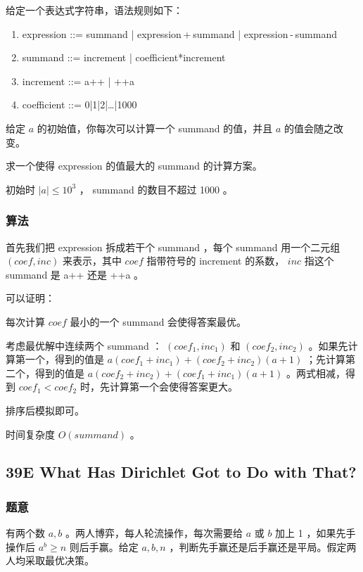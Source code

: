 \documentclass[11pt]{article}
\begin{document}
    给定一个表达式字符串，语法规则如下：
\begin{enumerate}
\item expression ::= summand | expression + summand | expression - summand
\item summand ::= increment | coefficient*increment
\item increment ::= a++ | ++a
\item coefficient ::= 0|1|2|\ldots{}|1000
\end{enumerate}

    给定 $a$ 的初始值，你每次可以计算一个 summand 的值，并且 $a$ 的值会随之改变。

    求一个使得 expression 的值最大的 summand 的计算方案。

    初始时 $|a| \leq 10^3$ ， summand 的数目不超过 1000 。
\subsubsection{算法}
\label{sec-3-2-2}

    首先我们把 expression 拆成若干个 summand ，每个 summand 用一个二元组 $(coef, inc)$ 来表示，其中 $coef$ 指带符号的 increment 的系数， $inc$ 指这个 summand 是 a++ 还是 ++a 。

    可以证明：
\begin{theorem}
   每次计算 $coef$ 最小的一个 summand 会使得答案最优。
\end{theorem}

    考虑最优解中连续两个 summand ： $(coef_1, inc_1)$ 和 $(coef_2, inc_2)$ 。如果先计算第一个，得到的值是 $a(coef_1 + inc_1) + (coef_2 + inc_2) (a + 1)$ ；先计算第二个，得到的值是 $a(coef_2 + inc_2) + (coef_1 + inc_1) (a + 1)$ 。两式相减，得到 $coef_1 < coef_2$ 时，先计算第一个会使得答案更大。

    排序后模拟即可。

    时间复杂度 $O(summand)$ 。
\subsection{39E   What Has Dirichlet Got to Do with That?}
\label{sec-3-3}
\subsubsection{题意}
\label{sec-3-3-1}

    有两个数 $a, b$ 。两人博弈，每人轮流操作，每次需要给 $a$ 或 $b$ 加上 1 ，如果先手操作后 $a^b \geq n$ 则后手赢。给定 $a, b, n$ ，判断先手赢还是后手赢还是平局。假定两人均采取最优决策。
\end{document}
